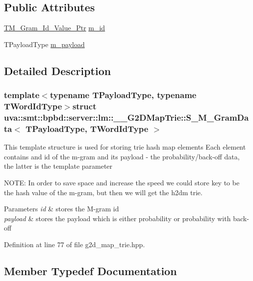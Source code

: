 \subsection*{Public Attributes}
\begin{DoxyCompactItemize}
\item 
\hyperlink{namespaceuva_1_1smt_1_1bpbd_1_1server_1_1lm_1_1m__grams_1_1m__gram__id_aa605051ded9336178d905e9581702378}{T\+M\+\_\+\+Gram\+\_\+\+Id\+\_\+\+Value\+\_\+\+Ptr} \hyperlink{structuva_1_1smt_1_1bpbd_1_1server_1_1lm_1_1_____g2_d_map_trie_1_1_s___m___gram_data_a49b4fadd9883c696728003dfe34ab068}{m\+\_\+id}
\item 
T\+Payload\+Type \hyperlink{structuva_1_1smt_1_1bpbd_1_1server_1_1lm_1_1_____g2_d_map_trie_1_1_s___m___gram_data_a6857a037ad8fa2dc5e69c0147a1ff01c}{m\+\_\+payload}
\end{DoxyCompactItemize}


\subsection{Detailed Description}
\subsubsection*{template$<$typename T\+Payload\+Type, typename T\+Word\+Id\+Type$>$struct uva\+::smt\+::bpbd\+::server\+::lm\+::\+\_\+\+\_\+\+G2\+D\+Map\+Trie\+::\+S\+\_\+\+M\+\_\+\+Gram\+Data$<$ T\+Payload\+Type, T\+Word\+Id\+Type $>$}

This template structure is used for storing trie hash map elements Each element contains and id of the m-\/gram and its payload -\/ the probability/back-\/off data, the latter is the template parameter

N\+O\+T\+E\+: In order to save space and increase the speed we could store key to be the hash value of the m-\/gram, but then we will get the h2dm trie.


\begin{DoxyParams}{Parameters}
{\em id} & stores the M-\/gram id \\
\hline
{\em payload} & stores the payload which is either probability or probability with back-\/off \\
\hline
\end{DoxyParams}


Definition at line 77 of file g2d\+\_\+map\+\_\+trie.\+hpp.



\subsection{Member Typedef Documentation}
\hypertarget{structuva_1_1smt_1_1bpbd_1_1server_1_1lm_1_1_____g2_d_map_trie_1_1_s___m___gram_data_a88a54f22f9c347843a007f3617bf34dc}{}
